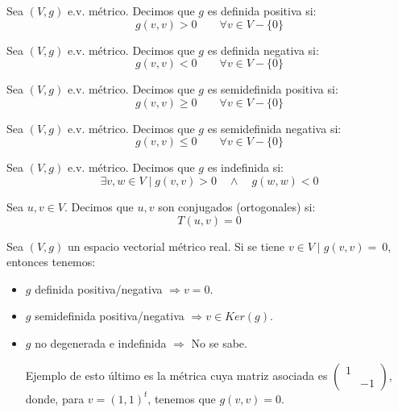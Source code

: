 \begin{definicion} Sea $(V,g)$  e.v. métrico. Decimos que $g$ es definida positiva si:
$$g(v,v)>0 \qquad \forall v\in V-\{0\}$$
\end{definicion}

\begin{definicion} Sea $(V,g)$  e.v. métrico. Decimos que $g$ es definida negativa si:
$$g(v,v)<0 \qquad \forall v\in V-\{0\}$$
\end{definicion}

\begin{definicion} Sea $(V,g)$  e.v. métrico. Decimos que $g$ es semidefinida positiva si:
$$g(v,v)\geq 0 \qquad \forall v\in V-\{0\}$$
\end{definicion}

\begin{definicion} Sea $(V,g)$  e.v. métrico. Decimos que $g$ es semidefinida negativa si:
$$g(v,v)\leq 0 \qquad \forall v\in V-\{0\}$$
\end{definicion}

\begin{definicion} Sea $(V,g)$  e.v. métrico. Decimos que $g$ es indefinida si:
$$\exists v,w \in V \mid g(v,v)>0 \quad \land \quad g(w,w)<0$$
\end{definicion}

\begin{definicion}
    Sea $u,v\in V$. Decimos que $u,v$ son conjugados (ortogonales) si:
    $$T(u,v)=0$$
\end{definicion}

\begin{observacion}
    Sea $(V,g)$ un espacio vectorial métrico real. Si se tiene $v\in V \mid g(v,v)=~0$, entonces tenemos:
    \begin{itemize}
        \item $g$ definida positiva/negativa $\Longrightarrow v=0$.

        \item $g$ semidefinida positiva/negativa $\Longrightarrow v\in Ker(g)$.

        \item $g$ no degenerada e indefinida $\Longrightarrow$ No se sabe.

        Ejemplo de esto último es la métrica cuya matriz asociada es $\left(\begin{array}{cc}
            1 &  \\
             & -1
        \end{array}\right)$, donde, para $v=(1,1)^t$, tenemos que $g(v,v)=0$.
    \end{itemize}
\end{observacion}

